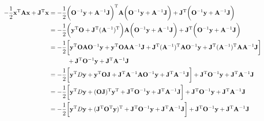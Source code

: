 \begin{itemize}
\begin{equation}
    \begin{split}
        -\frac{1}{2} {{\bf x}}^{\textnormal{T}} {{\bf A}} {{\bf x}} + {{\bf J}}^{\textnormal{T}} {{\bf x}} &= -\frac{1}{2} \bigg({\bf O}^{-1} {\bf y} + {\bf A}^{-1} {\bf J}\bigg)^{\textnormal{T}} {{\bf A}} \bigg({\bf O}^{-1} {\bf y} + {\bf A}^{-1} {\bf J}\bigg) + {{\bf J}}^{\textnormal{T}} \bigg({\bf O}^{-1} {\bf y} + {\bf A}^{-1} {\bf J}\bigg) \\
        &= -\frac{1}{2} \bigg(
        {\bf y}^{\textnormal{T}} {\bf O} + 
        {\bf J}^{\textnormal{T}} ({\bf A}^{-1})^{\textnormal{T}} \bigg){{\bf A}} \bigg({\bf O}^{-1} {\bf y} + {\bf A}^{-1} {\bf J}\bigg) + {{\bf J}}^{\textnormal{T}} \bigg({\bf O}^{-1} {\bf y} + {\bf A}^{-1} {\bf J}\bigg) \\
        &= - \frac{1}{2} \bigg[ {\bf y}^{\textnormal{T}} {\bf O} {\bf A} {\bf O}^{-1} {\bf y} + {\bf y}^{\textnormal{T}} {\bf O} {\bf A} {\bf A}^{-1} {\bf J} +  {\bf J}^{\textnormal{T}} ({\bf A}^{-1})^{\textnormal{T}} {\bf A} {\bf O}^{-1} {\bf y} +  {\bf J}^{\textnormal{T}} ({\bf A}^{-1})^{\textnormal{T}} {\bf A} {\bf A}^{-1} {\bf J} \bigg] \\
        & \blanky \blanky \blanky \blanky \blanky \blanky \blanky \blanky \blanky + {{\bf J}}^{\textnormal{T}} {\bf O}^{-1} {\bf y} + {{\bf J}}^{\textnormal{T}} {\bf A}^{-1} {\bf J} \\
        &= - \frac{1}{2} \bigg[ {\bf y}^{\textnormal{T}} D {\bf y} + {\bf y}^{\textnormal{T}} {\bf O} {\bf J} + {\bf J}^{\textnormal{T}} {\bf A}^{-1} {\bf A} {\bf O}^{-1} {\bf y} +  {\bf J}^{\textnormal{T}} {\bf A}^{-1} {\bf J} \bigg] + {{\bf J}}^{\textnormal{T}} {\bf O}^{-1} {\bf y} + {{\bf J}}^{\textnormal{T}} {\bf A}^{-1} {\bf J} \\
        &= - \frac{1}{2} \bigg[ {\bf y}^{\textnormal{T}} D {\bf y} + ({\bf O} {\bf J})^{\textnormal{T}}{\bf y}^{\textnormal{T}} + {\bf J}^{\textnormal{T}} {\bf O}^{-1} {\bf y} +  {\bf J}^{\textnormal{T}} {\bf A}^{-1} {\bf J} \bigg] + {{\bf J}}^{\textnormal{T}} {\bf O}^{-1} {\bf y} + {{\bf J}}^{\textnormal{T}} {\bf A}^{-1} {\bf J} \\
        &= - \frac{1}{2} \bigg[ {\bf y}^{\textnormal{T}} D {\bf y} + ({\bf J}^{\textnormal{T}}{\bf O}^{\textnormal{T}} {\bf y})^{\textnormal{T}} + {\bf J}^{\textnormal{T}} {\bf O}^{-1} {\bf y} +  {\bf J}^{\textnormal{T}} {\bf A}^{-1} {\bf J} \bigg] + {{\bf J}}^{\textnormal{T}} {\bf O}^{-1} {\bf y} + {{\bf J}}^{\textnormal{T}} {\bf A}^{-1} {\bf J} \\

\end{split}
\end{equation}
\end{itemize}

